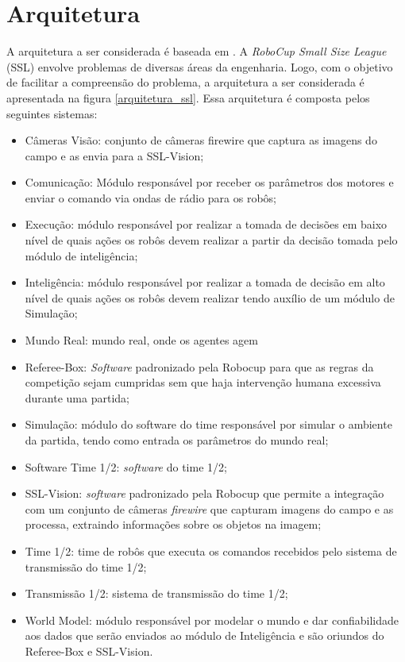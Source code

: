 \section{Arquitetura}

A arquitetura a ser considerada é baseada em \cite{felixnavarro}.
A \textit{RoboCup Small Size League} (SSL) envolve problemas de diversas áreas
da engenharia. Logo, com o objetivo de facilitar a compreensão do
problema, a arquitetura a ser considerada é apresentada na figura
\ref{arquitetura_ssl}. Essa arquitetura é composta pelos seguintes
sistemas:

\begin{itemize}
  \item Câmeras Visão: conjunto de câmeras firewire que captura as imagens do
        campo e as envia para a SSL-Vision;
  \item Comunicação: Módulo responsável por receber os parâmetros
        dos motores e enviar o comando via ondas de rádio para os
        robôs;
  \item Execução: módulo responsável por realizar a tomada de decisões
        em baixo nível de quais ações os robôs devem realizar a partir
        da decisão tomada pelo módulo de inteligência;
  \item Inteligência: módulo responsável por realizar a tomada de
        decisão em alto nível de quais ações os robôs devem realizar
        tendo auxílio de um módulo de Simulação;
  \item Mundo Real: mundo real, onde os agentes agem
  \item Referee-Box: \textit{Software} padronizado pela Robocup para que as
        regras da competição sejam cumpridas sem que haja intervenção
        humana excessiva durante uma partida;
  \item Simulação: módulo do software do time responsável por simular
        o ambiente da partida, tendo como entrada os parâmetros do mundo
        real;
  \item Software Time 1/2: \textit{software} do time 1/2;
  \item SSL-Vision: \textit{software} padronizado pela Robocup que permite a
        integração com um conjunto de câmeras \textit{firewire} que capturam
        imagens do campo e as processa, extraindo informações sobre os objetos na
        imagem;
  \item Time 1/2: time de robôs que executa os comandos recebidos pelo
        sistema de transmissão do time 1/2;
  \item Transmissão 1/2: sistema de transmissão do time 1/2;
  \item World Model: módulo responsável por modelar o mundo e dar
        confiabilidade aos dados que serão enviados ao módulo de
        Inteligência e são oriundos do Referee-Box e SSL-Vision.
\end{itemize}

